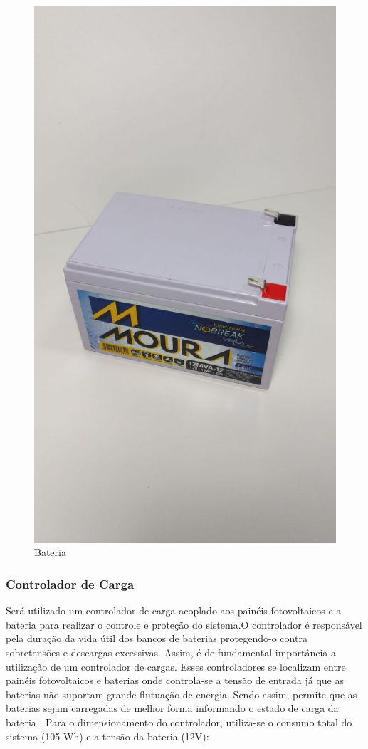 \begin{figure}[h]
\centering
\includegraphics[keepaspectratio=true,scale=0.15]{figuras/bateria2}
\caption{Bateria}
\label{Figura4}
\end{figure}

\subsubsection{Controlador de Carga}
Será utilizado um controlador de carga acoplado aos painéis
fotovoltaicos e a bateria para realizar o controle e proteção do sistema.O controlador é responsável pela duração da vida útil dos bancos de baterias protegendo-o contra sobretensões e descargas excessivas. Assim, é de fundamental importância a utilização de um controlador de cargas. Esses controladores se localizam entre painéis fotovoltaicos e baterias onde controla-se a tensão de entrada já que as baterias não suportam grande flutuação de energia. Sendo assim, permite que as baterias sejam carregadas de melhor forma informando o estado de carga da bateria \cite{serrao2010dimensionamento}.
Para o dimensionamento do controlador, utiliza-se o consumo total do sistema (105 Wh) e a tensão da bateria (12V):


